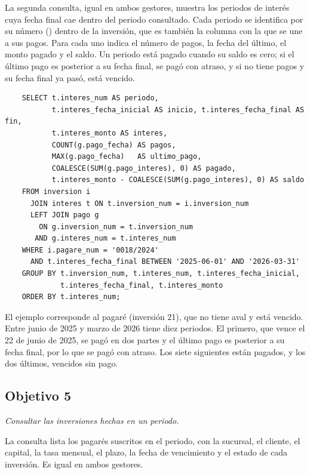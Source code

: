 La segunda consulta, igual en ambos gestores, muestra los periodos de inter\'es cuya fecha final cae dentro del periodo consultado. Cada periodo se identifica por su n\'umero () dentro de la inversi\'on, que es tambi\'en la columna con la que se une a sus pagos. Para cada uno indica el n\'umero de pagos, la fecha del \'ultimo, el monto pagado y el saldo. Un periodo est\'a pagado cuando su saldo es cero; si el \'ultimo pago es posterior a su fecha final, se pag\'o con atraso, y si no tiene pagos y su fecha final ya pas\'o, est\'a vencido.

\begin{verbatim}
	SELECT t.interes_num AS periodo,
	       t.interes_fecha_inicial AS inicio, t.interes_fecha_final AS fin,
	       t.interes_monto AS interes,
	       COUNT(g.pago_fecha) AS pagos,
	       MAX(g.pago_fecha)   AS ultimo_pago,
	       COALESCE(SUM(g.pago_interes), 0) AS pagado,
	       t.interes_monto - COALESCE(SUM(g.pago_interes), 0) AS saldo
	FROM inversion i
	  JOIN interes t ON t.inversion_num = i.inversion_num
	  LEFT JOIN pago g
	    ON g.inversion_num = t.inversion_num
	   AND g.interes_num = t.interes_num
	WHERE i.pagare_num = '0018/2024'
	  AND t.interes_fecha_final BETWEEN '2025-06-01' AND '2026-03-31'
	GROUP BY t.inversion_num, t.interes_num, t.interes_fecha_inicial,
	         t.interes_fecha_final, t.interes_monto
	ORDER BY t.interes_num;
\end{verbatim}

El ejemplo corresponde al pagar\'e  (inversi\'on 21), que no tiene aval y est\'a vencido. Entre junio de 2025 y marzo de 2026 tiene diez periodos. El primero, que vence el 22 de junio de 2025, se pag\'o en dos partes y el \'ultimo pago es posterior a su fecha final, por lo que se pag\'o con atraso. Los siete siguientes est\'an pagados, y los dos \'ultimos, vencidos sin pago.


\subsection{Objetivo 5}

\textit{Consultar las inversiones hechas en un periodo.}

La consulta lista los pagar\'es suscritos en el periodo, con la sucursal, el cliente, el capital, la tasa mensual, el plazo, la fecha de vencimiento y el estado de cada inversi\'on. Es igual en ambos gestores.

